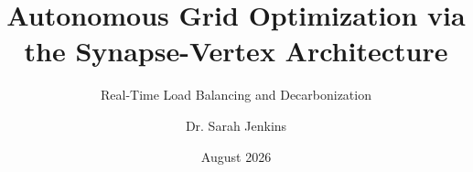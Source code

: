 
\usepackage[utf8]{inputenc}
\usepackage[T1]{fontenc}
\usepackage{amsmath,amssymb}
\usepackage{booktabs}
\usepackage{tikz}
\usetikzlibrary{positioning, calc, shapes.geometric, backgrounds, patterns}
\usepackage{fontawesome5}
\usepackage{colortbl}




\title[Synapse Energy Grid]{Autonomous Grid Optimization via the Synapse-Vertex Architecture}
\subtitle{Real-Time Load Balancing and Decarbonization}
\author[Dr. Sarah Jenkins]{Dr. Sarah Jenkins}
\date[LetX 2026]{August 2026}
